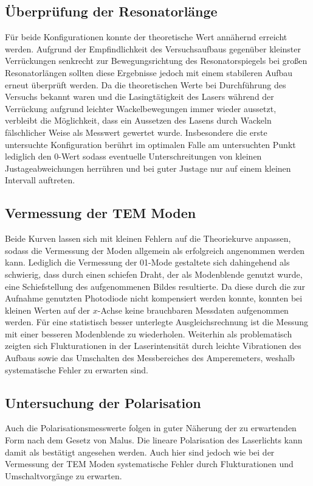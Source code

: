 \subsection{Überprüfung der Resonatorlänge}
Für beide Konfigurationen konnte der theoretische Wert annähernd erreicht werden.
Aufgrund der Empfindlichkeit des Versuchsaufbaus gegenüber kleinster Verrückungen
senkrecht zur Bewegungsrichtung des Resonatorspiegels bei großen Resonatorlängen sollten diese
Ergebnisse jedoch mit einem stabileren Aufbau erneut überprüft werden.
Da die theoretischen Werte bei Durchführung des Versuchs bekannt waren und die
Lasingtätigkeit des Lasers während der Verrückung aufgrund leichter Wackelbewegungen
immer wieder aussetzt, verbleibt die Möglichkeit, dass ein Aussetzen des Lasens
durch Wackeln fälschlicher Weise als Messwert gewertet wurde.
Insbesondere die erste untersuchte Konfiguration berührt im optimalen Falle
am untersuchten Punkt lediglich den $0$-Wert sodass eventuelle Unterschreitungen
von kleinen Justageabweichungen herrühren und bei guter Justage nur auf einem
kleinen Intervall auftreten.

\subsection{Vermessung der TEM Moden}
Beide Kurven lassen sich mit kleinen Fehlern auf die Theoriekurve anpassen,
sodass die Vermessung der Moden allgemein als erfolgreich angenommen werden kann.
Lediglich die Vermessung der 01-Mode gestaltete sich dahingehend als schwierig,
dass durch einen schiefen Draht, der als Modenblende genutzt wurde, eine Schiefstellung
des aufgenommenen Bildes resultierte. Da diese durch die zur Aufnahme genutzten
Photodiode nicht kompensiert werden konnte, konnten bei kleinen Werten auf der
$x$-Achse keine brauchbaren Messdaten aufgenommen werden.
Für eine statistisch besser unterlegte Ausgleichsrechnung ist die Messung mit
einer besseren Modenblende zu wiederholen.
Weiterhin als problematisch zeigten sich Flukturationen in der Laserintensität
durch leichte Vibrationen des Aufbaus sowie das Umschalten des Messbereiches des Amperemeters,
weshalb systematische Fehler zu erwarten sind.

\subsection{Untersuchung der Polarisation}
Auch die Polarisationsmesswerte folgen in guter Näherung der zu erwartenden Form
nach dem Gesetz von Malus. Die lineare Polarisation des Laserlichts kann damit
als bestätigt angesehen werden. Auch hier sind jedoch wie bei der Vermessung der TEM Moden
systematische Fehler durch Flukturationen und Umschaltvorgänge zu erwarten.

